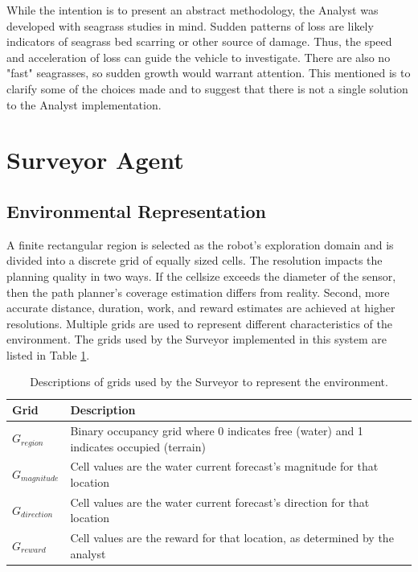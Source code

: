 \documentclass{tamuccthesis}
\begin{document}
While the intention is to present an abstract methodology, the Analyst was developed with seagrass studies in mind. Sudden patterns of loss are likely indicators of seagrass bed scarring or other source of damage. Thus, the speed and acceleration of loss can guide the vehicle to investigate. There are also no "fast" seagrasses, so sudden growth would warrant attention. This mentioned is to clarify some of the choices made and to suggest that there is not a single solution to the Analyst implementation. 

\section{Surveyor Agent}

\subsection{Environmental Representation}

A finite rectangular region is selected as the robot's exploration domain and is divided into a discrete grid of equally sized cells. The resolution impacts the planning quality in two ways. If the cellsize exceeds the diameter of the sensor, then the path planner's coverage estimation differs from reality. Second, more accurate distance, duration, work, and reward estimates are achieved at higher resolutions. Multiple grids are used to represent different characteristics of the environment. The grids used by the Surveyor implemented in this system are listed in Table \ref{tbl:grids}. 

\begin{table}[H]\small
\begin{tabular}{|l|l|}
\hline
Grid            & Description \\
\hline
$G_{region}$    & Binary occupancy grid where 0 indicates free (water) and 1 indicates occupied (terrain) \\
\hline
$G_{magnitude}$ & Cell values are the water current forecast's magnitude for that location \\
\hline
$G_{direction}$ & Cell values are the water current forecast's direction for that location \\
\hline
$G_{reward}$    & Cell values are the reward for that location, as determined by the analyst \\    
\hline
\end{tabular}
\caption{Descriptions of grids used by the Surveyor to represent the environment.}
\label{tbl:grids}
\end{table}
\end{document}
